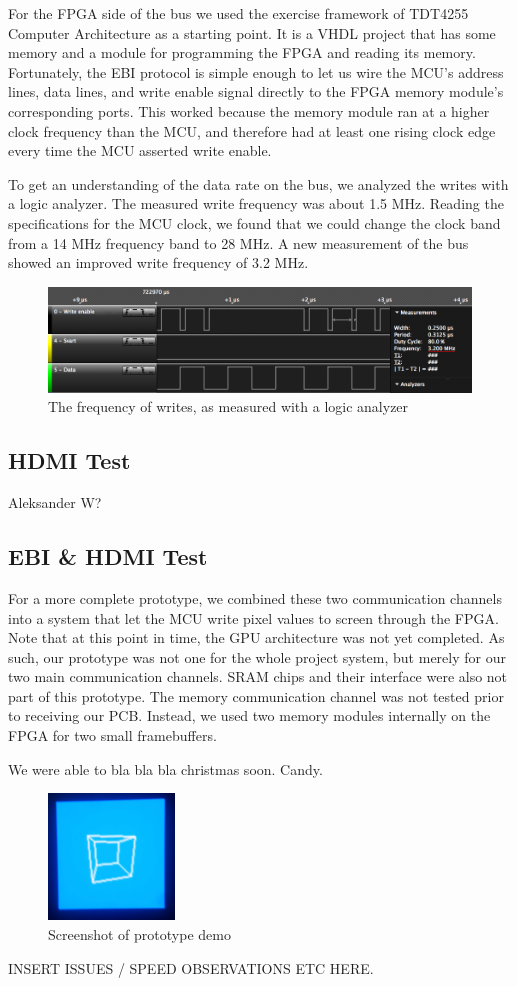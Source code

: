 For the FPGA side of the bus we used the exercise framework of TDT4255 Computer Architecture as a starting point.
It is a VHDL project that has some memory and a module for programming the FPGA and reading its memory.
Fortunately, the EBI protocol is simple enough to let us wire the MCU's address lines, data lines, and write enable signal directly to the FPGA memory module's corresponding ports.
This worked because the memory module ran at a higher clock frequency than the MCU, and therefore had at least one rising clock edge every time the MCU asserted write enable.

To get an understanding of the data rate on the bus, we analyzed the writes with a logic analyzer.
The measured write frequency was about 1.5 MHz.
Reading the specifications for the MCU clock, we found that we could change the clock band from a 14 MHz frequency band to 28 MHz.
A new measurement of the bus showed an improved write frequency of 3.2 MHz.

\begin{figure}[htp]
\centering
\includegraphics[width=\textwidth]{diagrams/ebi_bus_write_speed.png}
\caption{The frequency of writes, as measured with a logic analyzer}
\label{ebi_bis_write_speed}
\end{figure}

\subsection{HDMI Test}
Aleksander W?

\subsection{EBI \& HDMI Test}
For a more complete prototype, we combined these two communication channels into a system that let the MCU write pixel values to screen through the FPGA.
Note that at this point in time, the GPU architecture was not yet completed.
As such, our prototype was not one for the whole project system, but merely for our two main communication channels.
SRAM chips and their interface were also not part of this prototype.
The memory communication channel was not tested prior to receiving our PCB.
Instead, we used two memory modules internally on the FPGA for two small framebuffers.

We were able to bla bla bla christmas soon.
Candy.

\begin{figure}
\centering
\includegraphics[width=0.3\textwidth]{diagrams/prototype_demo.png}
\caption{Screenshot of prototype demo}
\label{prototype_demo}
\end{figure}

INSERT ISSUES / SPEED OBSERVATIONS ETC HERE.
